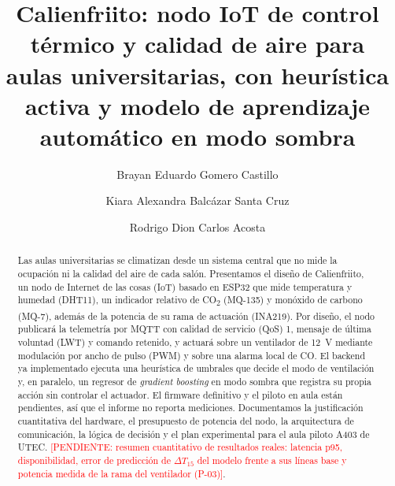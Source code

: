 \documentclass[manuscript,screen,nonacm,natbib=false]{acmart}
\newcommand{\pendiente}[1]{\textcolor{red}{[PENDIENTE: #1]}}
\newcommand{\COdos}{CO\textsubscript{2}}
\begin{document}
\title{Calienfriito: nodo IoT de control térmico y calidad de aire para aulas universitarias, con heurística activa y modelo de aprendizaje automático en modo sombra}
\renewcommand{\shorttitle}{Calienfriito: nodo IoT de control térmico y calidad de aire}

\author{Brayan Eduardo Gomero Castillo}

\author{Kiara Alexandra Balcázar Santa Cruz}

\author{Rodrigo Dion Carlos Acosta}

\renewcommand{\shortauthors}{Gomero, Balcázar y Carlos}

\begin{abstract}
Las aulas universitarias se climatizan desde un sistema central que no mide la ocupación ni la calidad del aire de cada salón. Presentamos el diseño de Calienfriito, un nodo de Internet de las cosas (IoT) basado en ESP32 que mide temperatura y humedad (DHT11), un indicador relativo de \COdos{} (MQ-135) y monóxido de carbono (MQ-7), además de la potencia de su rama de actuación (INA219). Por diseño, el nodo publicará la telemetría por MQTT con calidad de servicio (QoS) 1, mensaje de última voluntad (LWT) y comando retenido, y actuará sobre un ventilador de 12~V mediante modulación por ancho de pulso (PWM) y sobre una alarma local de CO. El backend ya implementado ejecuta una heurística de umbrales que decide el modo de ventilación y, en paralelo, un regresor de \textit{gradient boosting} en modo sombra que registra su propia acción sin controlar el actuador. El firmware definitivo y el piloto en aula están pendientes, así que el informe no reporta mediciones. Documentamos la justificación cuantitativa del hardware, el presupuesto de potencia del nodo, la arquitectura de comunicación, la lógica de decisión y el plan experimental para el aula piloto A403 de UTEC. \pendiente{resumen cuantitativo de resultados reales: latencia p95, disponibilidad, error de predicción de $\Delta T_{15}$ del modelo frente a sus líneas base y potencia medida de la rama del ventilador (P-03)}.
\end{abstract}

\end{document}
